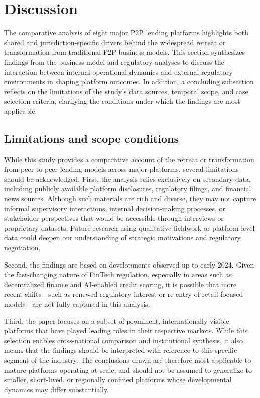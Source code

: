 \documentclass[pdflatex,sn-apa]{sn-jnl}%
\theoremstyle{thmstyleone}%
\theoremstyle{thmstyletwo}%
\theoremstyle{thmstylethree}%
\begin{document}
\section{Discussion}
\label{sec:discussion}

The comparative analysis of eight major P2P lending platforms highlights both shared and jurisdiction-specific drivers behind the widespread retreat or transformation from traditional P2P business models. This section synthesizes findings from the business model and regulatory analyses to discuss the interaction between internal operational dynamics and external regulatory environments in shaping platform outcomes. \textcolor{NavyBlue}{
In addition, a concluding subsection reflects on the limitations of the study’s data sources, temporal scope, and case selection criteria, clarifying the conditions under which the findings are most applicable.
}

\subsection{Limitations and scope conditions}

\textcolor{NavyBlue}{
While this study provides a comparative account of the retreat or transformation from peer-to-peer lending models across major platforms, several limitations should be acknowledged. First, the analysis relies exclusively on secondary data, including publicly available platform disclosures, regulatory filings, and financial news sources. Although such materials are rich and diverse, they may not capture informal supervisory interactions, internal decision-making processes, or stakeholder perspectives that would be accessible through interviews or proprietary datasets. Future research using qualitative fieldwork or platform-level data could deepen our understanding of strategic motivations and regulatory negotiation.}

\textcolor{NavyBlue}{
Second, the findings are based on developments observed up to early 2024. Given the fast-changing nature of FinTech regulation, especially in areas such as decentralized finance and AI-enabled credit scoring, it is possible that more recent shifts—such as renewed regulatory interest or re-entry of retail-focused models—are not fully captured in this analysis.}

\textcolor{NavyBlue}{
Third, the paper focuses on a subset of prominent, internationally visible platforms that have played leading roles in their respective markets. While this selection enables cross-national comparison and institutional synthesis, it also means that the findings should be interpreted with reference to this specific segment of the industry. The conclusions drawn are therefore most applicable to mature platforms operating at scale, and should not be assumed to generalize to smaller, short-lived, or regionally confined platforms whose developmental dynamics may differ substantially.}
\end{document}
